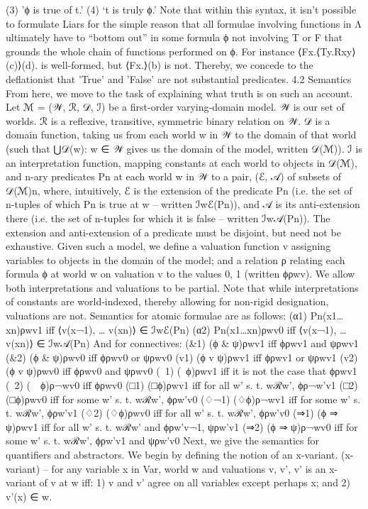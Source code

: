 \documentclass[]{article}
\begin{document}
(3)	'ϕ is true of t.'
(4)	‘t is truly ϕ.’
Note that within this syntax, it isn't possible to formulate Liars for the simple reason that all formulae involving functions in Λ ultimately have to “bottom out” in some formula ϕ not involving T or F that grounds the whole chain of functions performed on ϕ. For instance
⟨Fx.⟨Ty.Rxy⟩(c)⟩(d).
is well-formed, but
⟨Fx.⟩(b)
is not. Thereby, we concede to the deflationist that 'True' and 'False' are not substantial predicates.
4.2 Semantics
From here, we move to the task of explaining what truth is on such an account. Let ℳ = (𝒲, ℛ, 𝒟, ℐ) be a first-order varying-domain model. 𝒲 is our set of worlds. ℛ is a reflexive, transitive, symmetric binary relation on 𝒲. 𝒟 is a domain function, taking us from each world w in 𝒲 to the domain of that world (such that ⋃{𝒟(w): w ∈ 𝒲} gives us the domain of the model, written 𝒟(ℳ)).  ℐ is an interpretation function, mapping constants at each world to objects in 𝒟(ℳ), and n-ary predicates Pn at each world w in 𝒲  to a pair, (ℰ, 𝒜) of subsets of 𝒟(ℳ)n, where, intuitively, ℰ is the extension of the predicate Pn (i.e. the set of n-tuples of which Pn is true at w – written ℐwℰ(Pn)), and 𝒜 is its anti-extension there (i.e. the set of n-tuples for which it is false – written ℐw𝒜(Pn)). The extension and anti-extension of a predicate must be disjoint, but need not be exhaustive. 
Given such a model, we define a valuation function v assigning variables to objects in the domain of the model; and a relation ρ relating each formula ϕ at world w on valuation v to the values {0, 1} (written ϕρwv). We allow both interpretations and valuations to be partial. Note that while interpretations of constants are world-indexed, thereby allowing for non-rigid designation, valuations are not.
Semantics for atomic formulae are as follows:
(α1)	Pn(x1…xn)ρwv1 iff ⟨v(x¬1), … v(xn)⟩ ∈ ℐwℰ(Pn) 
(α2)	Pn(x1…xn)ρwv0 iff ⟨v(x¬1), … v(xn)⟩ ∈ ℐw𝒜(Pn) 
And for connectives: 
(&1)	(ϕ & ψ)ρwv1 iff ϕρwv1 and ψρwv1
(&2)	(ϕ & ψ)ρwv0 iff ϕρwv0 or ψρwv0
(v1)	(ϕ v ψ)ρwv1 iff ϕρwv1 or ψρwv1
(v2)	(ϕ v ψ)ρwv0 iff ϕρwv0 and ψρwv0
(~1)	(~ϕ)ρwv1 iff it is not the case that ϕρwv1
(~2)	(~~ϕ)ρ¬wv0 iff ϕρwv0
(□1)	(□ϕ)ρwv1 iff for all w’ s. t. wℛw’, ϕρ¬w’v1
(□2)	(□ϕ)ρwv0 iff for some w’ s. t. wℛw’, ϕρw’v0
(♢¬1)	(♢ϕ)ρ¬wv1 iff for some w’ s. t. wℛw’, ϕρw’v1
(♢2)	(♢ϕ)ρwv0 iff for all w’ s. t. wℛw’, ϕρw’v0
(⇒1)	(ϕ ⇒ ψ)ρwv1 iff for all w’ s. t. wℛw’ and ϕρw’v¬1, ψρw’v1
(⇒2)	(ϕ ⇒ ψ)ρ¬wv0 iff for some w’ s. t. wℛw’, ϕρw’v1 and ψρw’v0
Next, we give the semantics for quantifiers and abstractors. We begin by defining the notion of an x-variant. 
(x-variant) – for any variable x in Var, world w and valuations v, v’, v’ is an x-variant of v at w iff: 1) v and v’ agree on all variables except perhaps x; and 2) v’(x) ∈ w.
\end{document}
